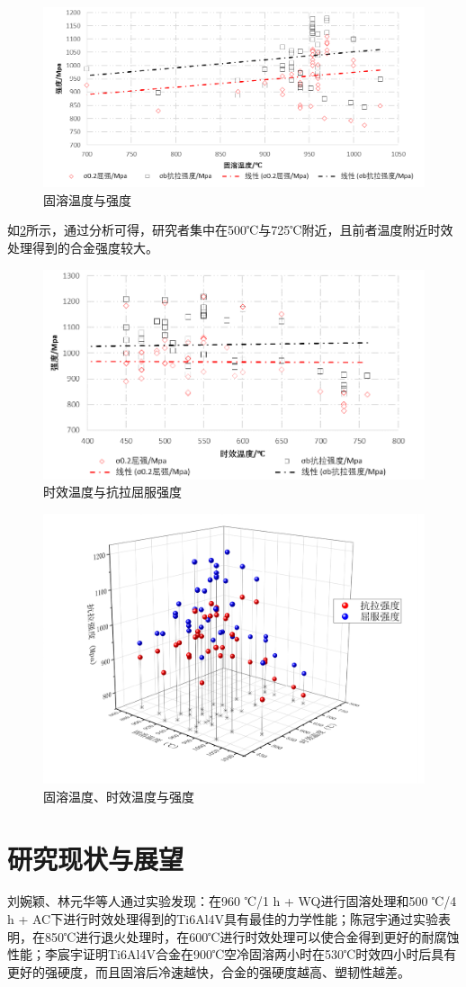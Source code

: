 \documentclass[
class = book,
zihao = -4,
font = noto,
paper = a4paper,
openany
]{easybook}
\newcommand{\ti}{Ti6Al4V}
\begin{document}
\begin{figure}[h!]
	\centering
	\includegraphics[width=0.7\linewidth]{固溶温度与强度}
	\caption{固溶温度与强度}
	\label{fig:固溶温度与强度}
\end{figure}

如\ref{fig:时效温度与抗拉屈服强度}所示，通过分析可得，研究者集中在500℃与725℃附近，且前者温度附近时效处理得到的合金强度较大。
\begin{figure}[h!]
	\centering
	\includegraphics[width=0.7\linewidth]{时效温度与强度}
	\caption{时效温度与抗拉屈服强度}
	\label{fig:时效温度与抗拉屈服强度}
\end{figure}

\begin{figure}[h!]
	\centering
	\includegraphics[width=0.7\linewidth]{固溶温度、时效温度与强度}
	\caption{固溶温度、时效温度与强度}
	\label{fig:}
\end{figure}

\section{研究现状与展望}
 刘婉颖、林元华等人通过实验发现：在960 ℃/1 h + WQ进行固溶处理和500 ℃/4 h + AC下进行时效处理得到的\ti 具有最佳的力学性能\cite{LiuWanYingBuTongReChuLiGongYiDuiTi6Al4VTaiHeJinWeiGuanJieGouHeLiXueXingNengYingXiangYingWen2017}；陈冠宇通过实验表明，在850℃进行退火处理时，在600℃进行时效处理可以使合金得到更好的耐腐蚀性能\cite{1200}；李宸宇证明\ti 合金在900℃空冷固溶两小时在530℃时效四小时后具有更好的强硬度，而且固溶后冷速越快，合金的强硬度越高、塑韧性越差\cite{900}。%






	\backmatter
	\listoffigures
	\listoftables
	\clearpage
	
\end{document}
